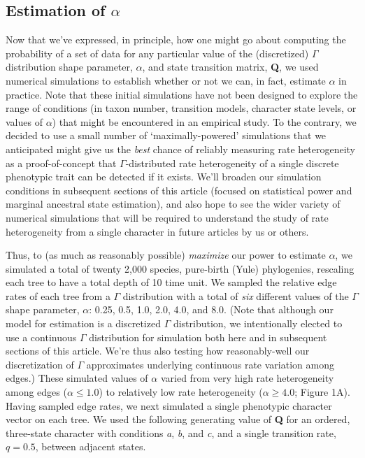 \documentclass[fleqn,10pt,lineno]{wlpeerj} %
\begin{document}
\subsection{\texorpdfstring{Estimation of \(\alpha\)}{Estimation of \textbackslash alpha}}\label{estimation-of-alpha}

Now that we've expressed, in principle, how one might go about computing the probability of a set of data for any particular value of the (discretized) \(\Gamma\) distribution shape parameter, \(\alpha\), and state transition matrix, \textbf{Q}, we used numerical simulations to establish whether or not we can, in fact, estimate \(\alpha\) in practice. Note that these initial simulations have not been designed to explore the range of conditions (in taxon number, transition models, character state levels, or values of \(\alpha\)) that might be encountered in an empirical study. To the contrary, we decided to use a small number of `maximally-powered' simulations that we anticipated might give us the \emph{best} chance of reliably measuring rate heterogeneity as a proof-of-concept that \(\Gamma\)-distributed rate heterogeneity of a single discrete phenotypic trait can be detected if it exists. We'll broaden our simulation conditions in subsequent sections of this article (focused on statistical power and marginal ancestral state estimation), and also hope to see the wider variety of numerical simulations that will be required to understand the study of rate heterogeneity from a single character in future articles by us or others.

Thus, to (as much as reasonably possible) \emph{maximize} our power to estimate \(\alpha\), we simulated a total of twenty 2,000 species, pure-birth (Yule) phylogenies, rescaling each tree to have a total depth of 10 time unit. We sampled the relative edge rates of each tree from a \(\Gamma\) distribution with a total of \emph{six} different values of the \(\Gamma\) shape parameter, \(\alpha\): 0.25, 0.5, 1.0, 2.0, 4.0, and 8.0. (Note that although our model for estimation is a discretized \(\Gamma\) distribution, we intentionally elected to use a continuous \(\Gamma\) distribution for simulation both here and in subsequent sections of this article. We're thus also testing how reasonably-well our discretization of \(\Gamma\) approximates underlying continuous rate variation among edges.) These simulated values of \(\alpha\) varied from very high rate heterogeneity among edges (\(\alpha \le 1.0\)) to relatively low rate heterogeneity (\(\alpha \ge 4.0\); Figure 1A). Having sampled edge rates, we next simulated a single phenotypic character vector on each tree. We used the following generating value of \textbf{Q} for an ordered, three-state character with conditions \emph{a}, \emph{b}, and \emph{c}, and a single transition rate, \(q=0.5\), between adjacent states.
\end{document}
